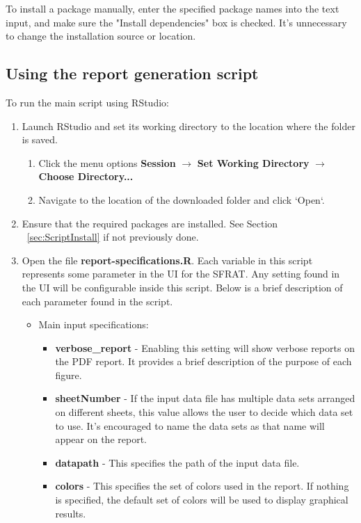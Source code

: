 \documentclass[conference]{IEEEtran}
\begin{document}
\noindent To install a package manually, enter the specified package names into the text input, and make sure the "Install dependencies" box is checked. It's unnecessary to change the installation source or location.

\subsection{Using the report generation script}\label{sec:ScriptRun}
To run the main script using RStudio:
\begin{enumerate}
  \item {Launch RStudio and set its working directory to the location where the folder is saved.
  \begin{enumerate}
    \item {Click the menu options \textbf{Session} $\to$ \textbf{Set Working Directory} $\to$ \textbf{Choose Directory...}}
    \item {Navigate to the location of the downloaded folder and click `Open`.}
  \end{enumerate}
  }
  \item {Ensure that the required packages are installed. See Section ~\ref{sec:ScriptInstall} if not previously done.}
  \item {Open the file \textbf{report-specifications.R}. Each variable in this script represents some parameter in the UI for the SFRAT. Any setting found in the UI will be configurable inside this script. Below is a brief description of each parameter found in the script.
  \begin{itemize}
    \item {Main input specifications: 
    \begin{itemize}
    \item {\textbf{verbose\_report} - Enabling this setting will show verbose reports on the PDF report. It provides a brief description of the purpose of each figure.}
      \item {\textbf{sheetNumber} - If the input data file has multiple data sets arranged on different sheets, this value allows the user to decide which data set to use. It's encouraged to name the data sets as that name will appear on the report.}
      \item {\textbf{datapath} - This specifies the path of the input data file.}
      \item {\textbf{colors} - This specifies the set of colors used in the report. If nothing is specified, the default set of colors will be used to display graphical results.}

\end{itemize}}
\end{itemize}}
\end{enumerate}
\end{document}
